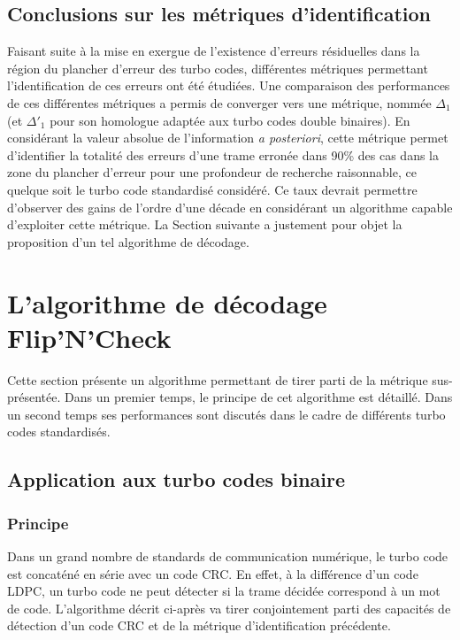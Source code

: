 \subsection{Conclusions sur les métriques d'identification}
Faisant suite à la mise en exergue de l'existence d'erreurs résiduelles dans la région du plancher d'erreur des turbo codes,
différentes métriques permettant l'identification de ces erreurs ont été étudiées. Une comparaison des performances de ces 
différentes métriques a permis de converger vers une métrique, nommée $\Delta_1$ (et $\Delta'_1$ pour son homologue 
adaptée aux turbo codes double binaires). En considérant la valeur absolue de l'information \textit{a posteriori}, cette
métrique permet d'identifier la totalité des erreurs d'une trame erronée dans 90\% des cas dans la zone du plancher 
d'erreur pour une profondeur de recherche raisonnable, ce quelque soit le turbo code standardisé considéré. Ce taux devrait
permettre d'observer des gains de l'ordre d'une décade en considérant un algorithme capable d'exploiter cette métrique. 
La Section suivante a justement pour 
objet la proposition d'un tel algorithme de décodage.

\section{L'algorithme de décodage Flip'N'Check}
Cette section présente un algorithme permettant de tirer parti de la métrique sus-présentée.
Dans un premier temps, le principe de cet algorithme est détaillé. Dans un second temps ses performances sont discutés 
dans le cadre de différents turbo codes standardisés.
\subsection{Application aux turbo codes binaire}

\subsubsection{Principe}
Dans un grand nombre de standards de communication numérique, le turbo code est concaténé en série avec un code CRC. En 
effet, à la différence d'un code LDPC, un turbo code ne peut détecter si la trame décidée correspond à un mot de code. 
L'algorithme  décrit ci-après va tirer conjointement parti des capacités de détection d'un code CRC et de la métrique 
d'identification précédente. 

